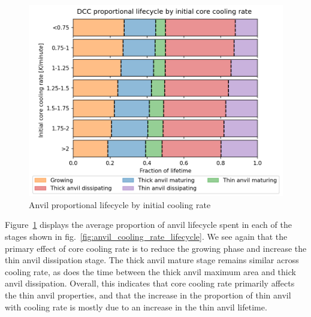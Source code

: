 \begin{figure}[tp]
    \centering
    \includegraphics[width=\textwidth]{figures/ch2_23.png}
    \caption{Anvil proportional lifecycle by initial cooling rate}
    \label{fig:anvil_cooling_rate_proportional_lifecycle}
\end{figure}

Figure~\ref{fig:anvil_cooling_rate_proportional_lifecycle} displays the average proportion of anvil lifecycle spent in each of the stages shown in fig.~\ref{fig:anvil_cooling_rate_lifecycle}.
We see again that the primary effect of core cooling rate is to reduce the growing phase and increase the thin anvil dissipation stage.
The thick anvil mature stage remains similar across cooling rate, as does the time between the thick anvil maximum area and thick anvil dissipation.
Overall, this indicates that core cooling rate primarily affects the thin anvil properties, and that the increase in the proportion of thin anvil with cooling rate  is mostly due to an increase in the thin anvil lifetime.

